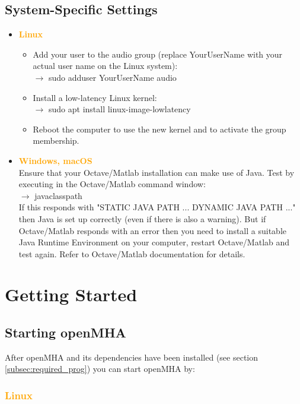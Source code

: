 \documentclass[11pt,a4paper,twoside]{article}
\newcommand{\+}{\discretionary{\mbox{\scriptsize$\hookleftarrow$}}{}{}}
\begin{document}
\subsection{System-Specific Settings}

\begin{itemize}
\item \textcolor{orange}{\textbf{Linux}}
  \begin{itemize}
  \item Add your user to the {\ttfamily audio} group (replace {\ttfamily
    YourUserName} with your actual user name on the Linux system): \\
    $\rightarrow$ {\ttfamily sudo adduser YourUserName audio}
  \item Install a low-latency Linux kernel: \\
    $\rightarrow$ {\ttfamily sudo apt install linux-image-lowlatency}
  \item Reboot the computer to use the new kernel and to activate the group
    membership.
  \end{itemize}
\item \textcolor{orange}{\textbf{Windows, macOS}} \\
  Ensure that your Octave/Matlab installation can make use of Java.
  Test by executing in the Octave/Matlab command window: \\
  $\rightarrow$ {\ttfamily javaclasspath} \\
  If this responds with "STATIC JAVA PATH ... DYNAMIC JAVA PATH ..." then
  Java is set up correctly (even if there is also a warning).
  But if Octave/Matlab responds with an error then you need to install a
  suitable Java Runtime Environment on your computer, restart Octave/Matlab
  and test again. Refer to Octave/Matlab documentation for details.
\end{itemize}

\section{Getting Started}

\subsection{Starting openMHA}
\label{starting_openmha}
    
After openMHA and its dependencies have been installed
(see section \ref{subsec:required_prog}) you can start openMHA by: 

\subsubsection*{\textcolor{orange}{\textbf{Linux}}}
\end{document}
